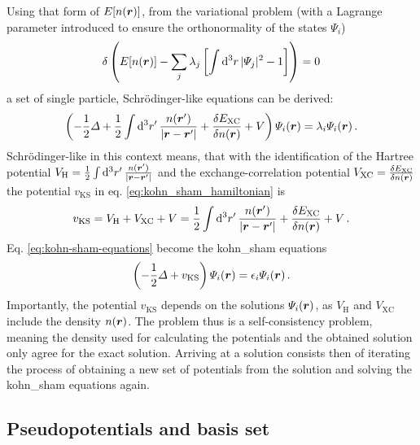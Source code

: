 \documentclass[main.tex]{subfiles}
\begin{document}
Using that form of \(E[n(\vb*{r})]\), from the variational problem (with a Lagrange parameter introduced to ensure the orthonormality of the states \(\Psi_i\))
\begin{align}
     \delta \left( E [n(\vb*{r})] - \sum_j \lambda_j \left[\int \dd[3]{r} \vert \Psi_j \vert^2 - 1 \right] \right) = 0
\end{align}
a set of single particle, Schrödinger-like equations can be derived:
\begin{equation}\label{eq:kohn-sham-equations}
    \left(-\frac{1}{2} \Delta + \frac{1}{2} \int \dd[3]{r^{\prime}} \frac{n(\vb*{r}^{\prime})}{\vert \vb*{r} - \vb*{r}^{\prime} \vert} + \fdv{E_{\mathrm{XC}}}{n(\vb*{r})} + V\right) \Psi_i (\vb*{r}) = \lambda_i \Psi_i (\vb*{r})\,.
\end{equation}
Schrödinger-like in this context means, that with the identification of the Hartree potential \(V_{\mathrm{H}} = \frac{1}{2} \int \dd[3]{r^{\prime}} \frac{n(\vb*{r}^{\prime})}{\vert \vb*{r} - \vb*{r}^{\prime} \vert}\) and the exchange-correlation potential \(V_{\mathrm{XC}} = \fdv{E_{\mathrm{XC}}}{n(\vb*{r})}\) the potential \(v_{\mathrm{KS}}\) in eq. \ref{eq:kohn_sham_hamiltonian} is
\begin{equation}
    v_{\mathrm{KS}} =  V_{\mathrm{H}} + V_{\mathrm{XC}} + V = \frac{1}{2} \int \dd[3]{r^{\prime}} \frac{n(\vb*{r}^{\prime})}{\vert \vb*{r} - \vb*{r}^{\prime} \vert} + \fdv{E_{\mathrm{XC}}}{n(\vb*{r})} + V\,.
\end{equation}
Eq. \ref{eq:kohn-sham-equations} become the \acrshort{kohn_sham} equations
\begin{equation}
    \left(- \frac{1}{2} \Delta + v_{\mathrm{KS}}\right) \Psi_i (\vb*{r}) = \epsilon_i \Psi_i (\vb*{r})\,.
\end{equation}
Importantly, the potential \(v_{\mathrm{KS}}\) depends on the solutions \(\Psi_i (\vb*{r})\), as \(V_{\mathrm{H}}\) and \(V_{\mathrm{XC}}\) include the density \(n(\vb*{r})\).
The problem thus is a self-consistency problem, meaning the density used for calculating the potentials and the obtained solution only agree for the exact solution.
Arriving at a solution consists then of iterating the process of obtaining a new set of potentials from the solution and solving the \acrshort{kohn_sham} equations again.

\subsection{Pseudopotentials and basis set}\label{sub:theory_basis_set}
\end{document}
